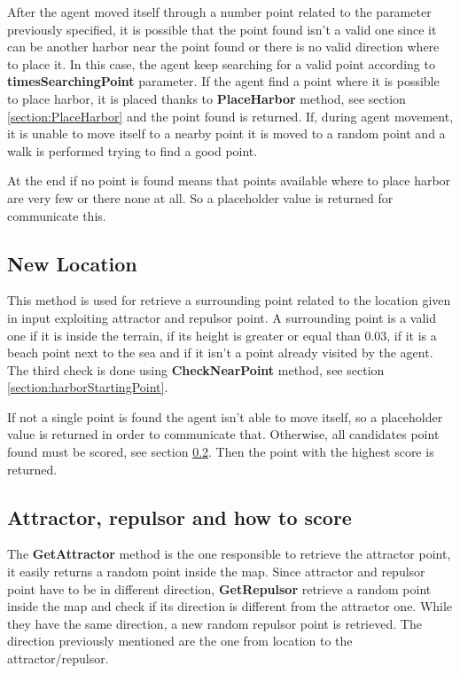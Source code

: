 \documentclass[12pt]{article}
\begin{document}
    After the agent moved itself through a number point related to the parameter previously specified, it is possible that the point found isn't a valid one since it can be another
    harbor near the point found or there is no valid direction where to place it. In this case, the agent keep searching for a valid point according to \textbf{timesSearchingPoint}
    parameter. If the agent find a point where it is possible to place harbor, it is placed thanks to \textbf{PlaceHarbor} method, see section \ref{section:PlaceHarbor} and the 
    point found is returned. If, during agent movement, it is unable to move itself to a nearby point it is moved to a random point and a walk is performed trying to find a 
    good point. 

    At the end if no point is found means that points available where to place harbor are very few or there none at all. So a placeholder value is returned for communicate this.

    \subsection{New Location} \label{section:HarborNewLocation}
    This method is used for retrieve a surrounding point related to the location given in input exploiting attractor and repulsor point. A surrounding point is a valid one if
    it is inside the terrain, if its height is greater or equal than 0.03, if it is a beach point next to the sea and if it isn't a point already visited by the agent.
    The third check is done using \textbf{CheckNearPoint} method, see section \ref{section:harborStartingPoint}. 

    If not a single point is found the agent isn't able to move itself, so a placeholder value is returned in order to communicate that. Otherwise, all candidates point found must
    be scored, see section \ref{section:attractor}. Then the point with the highest score is returned.

    \subsection{Attractor, repulsor and how to score} \label{section:attractor}
    The \textbf{GetAttractor} method is the one responsible to retrieve the attractor point, it easily returns a random point inside the map. Since attractor and repulsor point
    have to be in different direction, \textbf{GetRepulsor} retrieve a random point inside the map and check if its direction is different from the attractor one. While they have 
    the same direction, a new random repulsor point is retrieved. The direction previously mentioned are the one from location to the attractor/repulsor.
\end{document}

